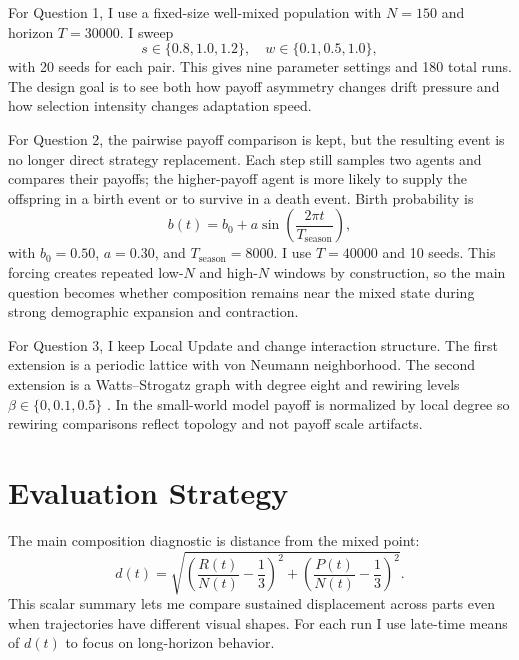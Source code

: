 \documentclass[11pt,a4paper]{article}
\begin{document}
For Question 1, I use a fixed-size well-mixed population with $N=150$ and horizon $T=30000$. I sweep
\begin{equation*}
s\in\{0.8,1.0,1.2\},\quad w\in\{0.1,0.5,1.0\},
\end{equation*}
with 20 seeds for each pair. This gives nine parameter settings and 180 total runs. The design goal is to see both how payoff asymmetry changes drift pressure and how selection intensity changes adaptation speed.

For Question 2, the pairwise payoff comparison is kept, but the resulting event is no longer direct strategy replacement. Each step still samples two agents and compares their payoffs; the higher-payoff agent is more likely to supply the offspring in a birth event or to survive in a death event. Birth probability is
\begin{equation}
b(t)=b_0+a\sin\left(\frac{2\pi t}{T_{\text{season}}}\right),
\end{equation}
with $b_0=0.50$, $a=0.30$, and $T_{\text{season}}=8000$. I use $T=40000$ and 10 seeds. This forcing creates repeated low-$N$ and high-$N$ windows by construction, so the main question becomes whether composition remains near the mixed state during strong demographic expansion and contraction.

For Question 3, I keep Local Update and change interaction structure. The first extension is a periodic lattice with von Neumann neighborhood. The second extension is a Watts--Strogatz graph with degree eight and rewiring levels $\beta\in\{0,0.1,0.5\}$ \cite{watts1998,szabo2007,reichenbach2007,varga2014}. In the small-world model payoff is normalized by local degree so rewiring comparisons reflect topology and not payoff scale artifacts.

\section{Evaluation Strategy}
The main composition diagnostic is distance from the mixed point:
\begin{equation}
d(t)=\sqrt{\left(\frac{R(t)}{N(t)}-\frac{1}{3}\right)^2+\left(\frac{P(t)}{N(t)}-\frac{1}{3}\right)^2}.
\label{eq:distance}
\end{equation}
This scalar summary lets me compare sustained displacement across parts even when trajectories have different visual shapes. For each run I use late-time means of $d(t)$ to focus on long-horizon behavior.
\end{document}
